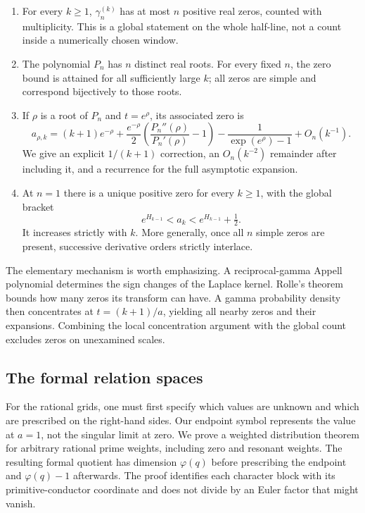 \begin{enumerate}
\item For every $k\geq1$, $\gamma_n^{(k)}$ has at most $n$ positive real
zeros, counted with multiplicity.  This is a global statement on the
whole half-line, not a count inside a numerically chosen window.
\item The polynomial $P_n$ has $n$ distinct real roots.  For every fixed
$n$, the zero bound is attained for all sufficiently large $k$; all
zeros are simple and correspond bijectively to those roots.
\item If $\rho$ is a root of $P_n$ and $t=e^\rho$, its associated zero is
\begin{equation}\label{intro:zero-result}
 a_{\rho,k}=(k+1)e^{-\rho}
   +\frac{e^{-\rho}}2\left(\frac{P_n''(\rho)}{P_n'(\rho)}-1\right)
   -\frac1{\exp(e^\rho)-1}+O_n(k^{-1}).
\end{equation}
We give an explicit $1/(k+1)$ correction, an $O_n(k^{-2})$ remainder
after including it, and a recurrence for the full asymptotic expansion.
\item At $n=1$ there is a unique positive zero for every $k\geq1$, with
the global bracket
\[
 e^{H_{k-1}}<a_k<e^{H_{k-1}}+\tfrac12.
\]
It increases strictly with $k$.  More generally, once all $n$ simple
zeros are present, successive derivative orders strictly interlace.
\end{enumerate}

The elementary mechanism is worth emphasizing.  A reciprocal-gamma
Appell polynomial determines the sign changes of the Laplace kernel.
Rolle's theorem bounds how many zeros its transform can have.  A gamma
probability density then concentrates at $t=(k+1)/a$, yielding all
nearby zeros and their expansions.  Combining the local concentration
argument with the global count excludes zeros on unexamined scales.

\subsection{The formal relation spaces}

For the rational grids, one must first specify which values are unknown
and which are prescribed on the right-hand sides.  Our endpoint symbol
represents the value at $a=1$, not the singular limit at zero.
We prove a weighted distribution theorem for arbitrary rational prime
weights, including zero and resonant weights.  The resulting formal
quotient has dimension $\varphi(q)$ before prescribing the endpoint and
$\varphi(q)-1$ afterwards.  The proof identifies each character block
with its primitive-conductor coordinate and does not divide by an
Euler factor that might vanish.

